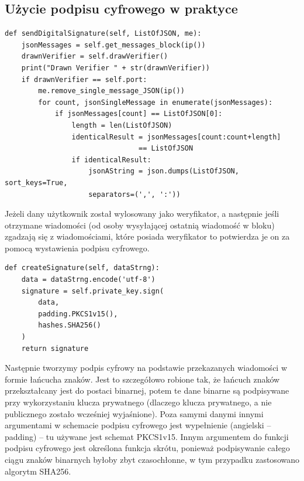 \subsection{Użycie podpisu cyfrowego w praktyce}
\begin{lstlisting}
def sendDigitalSignature(self, ListOfJSON, me):
    jsonMessages = self.get_messages_block(ip())
    drawnVerifier = self.drawVerifier()
    print("Drawn Verifier " + str(drawnVerifier))
    if drawnVerifier == self.port:
        me.remove_single_message_JSON(ip())
        for count, jsonSingleMessage in enumerate(jsonMessages):
            if jsonMessages[count] == ListOfJSON[0]:
                length = len(ListOfJSON)
                identicalResult = jsonMessages[count:count+length]
                                == ListOfJSON
                if identicalResult:
                    jsonAString = json.dumps(ListOfJSON, sort_keys=True,
                    separators=(',', ':'))
\end{lstlisting}
Jeżeli dany użytkownik został wylosowany jako weryfikator, a następnie jeśli otrzymane wiadomości (od osoby wysyłającej ostatnią wiadomość w bloku) zgadzają się z wiadomościami, które posiada weryfikator to potwierdza je on za pomocą wystawienia podpisu cyfrowego.
\begin{lstlisting}
def createSignature(self, dataStrng):
    data = dataStrng.encode('utf-8')
    signature = self.private_key.sign(
        data,
        padding.PKCS1v15(),
        hashes.SHA256()
    )
    return signature
\end{lstlisting}
Następnie tworzymy podpis cyfrowy na podstawie przekazanych wiadomości w formie łańcucha znaków. Jest to szczegółowo robione tak, że łańcuch znaków przekształcany jest do postaci binarnej, potem te dane binarne są podpisywane przy wykorzystaniu klucza prywatnego (dlaczego klucza prywatnego, a nie publicznego zostało wcześniej wyjaśnione). Poza samymi danymi innymi argumentami w schemacie podpisu cyfrowego jest wypełnienie (angielski – padding) – tu używane jest schemat PKCS1v15. Innym argumentem do funkcji podpisu cyfrowego jest określona funkcja skrótu, ponieważ podpisywanie całego ciągu znaków binarnych byłoby zbyt czasochłonne, w tym przypadku zastosowano algorytm SHA256.

\vspace{1em}

